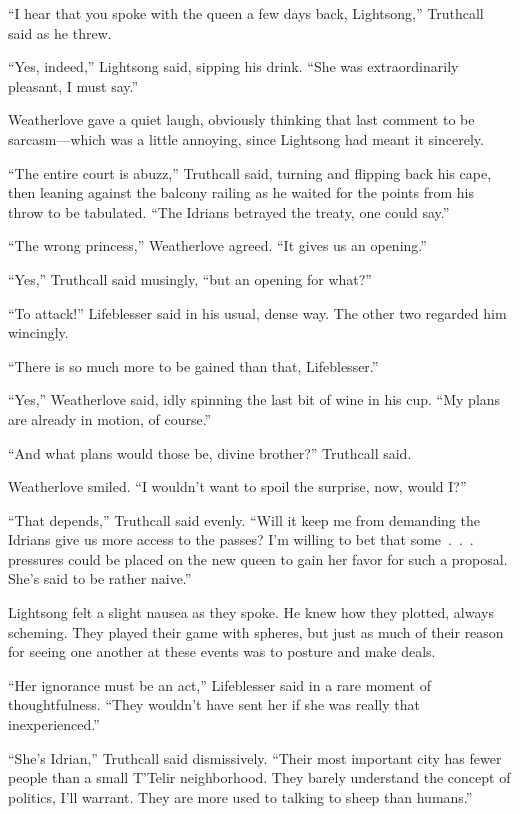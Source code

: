 “I hear that you spoke with the queen a few days back, Lightsong,” Truthcall said as he threw.

“Yes, indeed,” Lightsong said, sipping his drink. “She was extraordinarily pleasant, I must say.”

Weatherlove gave a quiet laugh, obviously thinking that last comment to be sarcasm—which was a little annoying, since Lightsong had meant it sincerely.

“The entire court is abuzz,” Truthcall said, turning and flipping back his cape, then leaning against the balcony railing as he waited for the points from his throw to be tabulated. “The Idrians betrayed the treaty, one could say.”

“The wrong princess,” Weatherlove agreed. “It gives us an opening.”

“Yes,” Truthcall said musingly, “but an opening for what?”

“To attack!” Lifeblesser said in his usual, dense way. The other two regarded him wincingly.

“There is so much more to be gained than that, Lifeblesser.”

“Yes,” Weatherlove said, idly spinning the last bit of wine in his cup. “My plans are already in motion, of course.”

“And what plans would those be, divine brother?” Truthcall said.

Weatherlove smiled. “I wouldn’t want to spoil the surprise, now, would I?”

“That depends,” Truthcall said evenly. “Will it keep me from demanding the Idrians give us more access to the passes? I’m willing to bet that some~.~.~. pressures could be placed on the new queen to gain her favor for such a proposal. She’s said to be rather naive.”

Lightsong felt a slight nausea as they spoke. He knew how they plotted, always scheming. They played their game with spheres, but just as much of their reason for seeing one another at these events was to posture and make deals.

“Her ignorance must be an act,” Lifeblesser said in a rare moment of thoughtfulness. “They wouldn’t have sent her if she was really that inexperienced.”

“She’s Idrian,” Truthcall said dismissively. “Their most important city has fewer people than a small T’Telir neighborhood. They barely understand the concept of politics, I’ll warrant. They are more used to talking to sheep than humans.”

